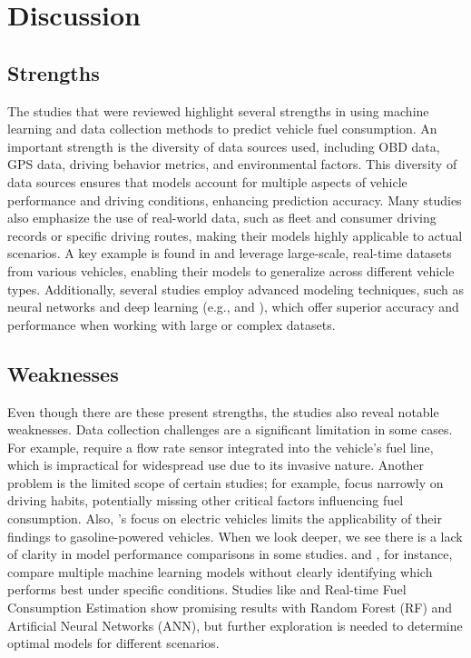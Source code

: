 \documentclass[letterpaper]{article}
\begin{document}
\section*{Discussion}

\subsection*{Strengths}

The studies that were reviewed highlight several strengths in using machine learning and data 
collection methods to predict vehicle fuel consumption. An important strength is the diversity 
of data sources used, including OBD data, GPS data, driving behavior metrics, and environmental 
factors. This diversity of data sources ensures that models account for multiple aspects of 
vehicle performance and driving conditions, enhancing prediction accuracy. Many studies also 
emphasize the use of real-world data, such as fleet and consumer driving records or specific 
driving routes, making their models highly applicable to actual scenarios. A key example is 
found in \cite{yang2022predicting} and \cite{abukhalil2020fuel} leverage large-scale, 
real-time datasets from various vehicles, enabling their models to generalize across different 
vehicle types. Additionally, several studies employ advanced modeling techniques, such as 
neural networks and deep learning (e.g., \cite{yen_combining_2021} and \cite{wang2020fuelnet}), 
which offer superior  accuracy and performance when working with large or complex datasets.

\subsection*{Weaknesses}

Even though there are these present strengths, the studies also reveal notable weaknesses. 
Data collection challenges are a significant limitation in some cases. For example, 
\cite{al2007experimental} require a flow rate sensor integrated into the vehicle's fuel line, 
which is impractical for widespread use due to its invasive nature. Another problem is the 
limited scope of certain studies; for example, \cite{Manjunath2024} focus narrowly on driving 
habits, potentially missing other critical factors influencing fuel consumption. Also, 
\cite{filla2025using}'s focus on electric vehicles limits the applicability of their findings 
to gasoline-powered vehicles. When we look deeper, we see there is a lack of clarity in model
performance comparisons in some studies. \cite{yang2022predicting} and \cite{zhang2023novel}, 
for instance, compare multiple machine learning models without clearly identifying which 
performs best under specific conditions. Studies like \cite{abukhalil2020fuel} and Real-time 
Fuel Consumption Estimation show promising results with Random Forest (RF) and Artificial 
Neural Networks (ANN), but further exploration is needed to determine optimal models for 
different scenarios.
\end{document}
